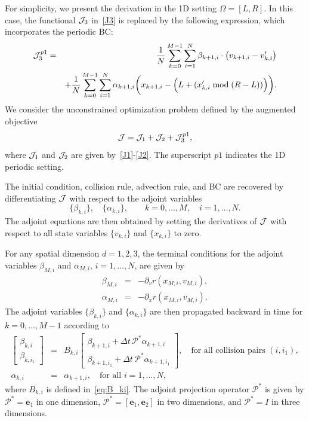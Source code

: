 \documentclass[12pt,nopreprintline]{elsarticle}
\begin{document}
For simplicity, we present the derivation in the 1D setting $\Omega = [L,R]$. In this case, the functional $\mathcal J_3$ in~\eqref{J3} is replaced by the following expression, which incorporates the periodic BC:
\begin{eqnarray}
\mathcal J_3^{p1} &=& \frac{1}{N} \sum_{k=0}^{M-1} \sum_{i=1}^N \beta_{k+1,i} \cdot \bigl(v_{k+1,i}-v'_{k,i}\bigr) \nonumber\\
&& + \frac{1}{N} \sum_{k=0}^{M-1} \sum_{i=1}^N \alpha_{k+1,i}
\biggl(x_{k+1,i}-\Bigl(L + (x'_{k,i} \bmod (R-L))\Bigr)\biggr).
\label{J5_p1}
\end{eqnarray}
We consider the unconstrained optimization problem defined by the augmented objective
\[
\mathcal J = \mathcal J_1 + \mathcal J_2 + \mathcal J_3^{p1},
\]
where $\mathcal J_1$ and $\mathcal J_2$ are given by~\eqref{J1}-\eqref{J2}. The superscript $p1$ indicates the 1D periodic setting.

The initial condition, collision rule, advection rule, and BC are recovered by differentiating $\mathcal J$ with respect to the adjoint variables
\[
\{\beta_{k,i}\}, \quad \{\alpha_{k,i}\}, \qquad k = 0,\ldots,M,\quad i = 1,\ldots,N.
\]
The adjoint equations are then obtained by setting the derivatives of $\mathcal J$ with respect to all state variables $\{v_{k,i}\}$ and $\{x_{k,i}\}$ to zero.

For any spatial dimension $d=1,2,3$, the terminal conditions for the adjoint variables $\beta_{M,i}$ and $\alpha_{M,i}$, $i=1,\ldots,N$, are given by
\begin{eqnarray}
\beta_{M,i} &=& -\partial_v r(x_{M,i},v_{M,i}), \label{eq:J_v_final}\\
\alpha_{M,i} &=& -\partial_x r(x_{M,i},v_{M,i}). \label{eq:J_x_final}
\end{eqnarray}
The adjoint variables $\{\beta_{k,i}\}$ and $\{\alpha_{k,i}\}$ are then propagated backward in time for $k=0,\ldots,M-1$ according to
\begin{eqnarray}
\begin{bmatrix}
\beta_{k,i} \\
\beta_{k,i_1}
\end{bmatrix}
&=&
B_{k,i}
\begin{bmatrix}
\beta_{k+1,i} + \Delta t\, \mathcal P^* \alpha_{k+1,i} \\
\beta_{k+1,i_1} + \Delta t\, \mathcal P^* \alpha_{k+1,i_1}
\end{bmatrix},
\quad \text{for all collision pairs $(i,i_1)$},
\label{eq:adjoint_gamma_P}\\
\alpha_{k,i} &=& \alpha_{k+1,i}, \quad \text{for all } i=1,\ldots,N,
\label{eq:adjoint_alpha_P}
\end{eqnarray}
where $B_{k,i}$ is defined in~\eqref{eq:B_ki}. The adjoint projection operator $\mathcal P^*$ is given by $\mathcal P^*=\mathbf e_1$ in one dimension, $\mathcal P^*=[\mathbf e_1,\mathbf e_2]$ in two dimensions, and $\mathcal P^*=I$ in three dimensions.
\end{document}
